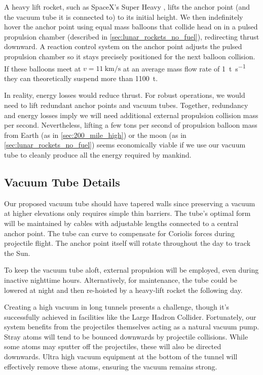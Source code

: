 \documentclass{article}
\begin{document}
A heavy lift rocket, such as SpaceX's Super Heavy \cite{spacex_super_heavy}, lifts the anchor point (and the vacuum tube it is connected to) to its initial height.  We then indefinitely hover the anchor point using equal mass balloons that collide head on in a pulsed propulsion chamber (described in \autoref{sec:lunar_rockets_no_fuel}), redirecting thrust downward.  A reaction control system on the anchor point adjusts the pulsed propulsion chamber so it stays precisely positioned for the next balloon collision.  If these balloons meet at $v=\SI{11}{\kilo\meter\per\second}$ at an average mass flow rate of \SI{1}{\tonne\per\second} they can theoretically suspend more than \SI{1100}{\tonne}.   

In reality, energy losses would reduce thrust.   For robust operations, we would need to lift redundant anchor points and vacuum tubes.  Together, redundancy and energy losses imply we will need additional external propulsion collision mass per second.  Nevertheless, lifting a few tons per second of propulsion balloon mass from Earth (as in \autoref{sec:200_mile_high}) or the moon (as in \autoref{sec:lunar_rockets_no_fuel}) seems economically viable if we use our vacuum tube to cleanly produce all the energy required by mankind. 

\subsection{Vacuum Tube Details}
Our proposed vacuum tube should have tapered walls since preserving a vacuum at higher elevations only requires simple thin barriers. The tube's optimal form will be maintained by cables with adjustable lengths connected to a central anchor point. The tube can curve to compensate for Coriolis forces during projectile flight. The anchor point itself will rotate throughout the day to track the Sun.

To keep the vacuum tube aloft, external propulsion will be employed, even during inactive nighttime hours. Alternatively, for maintenance, the tube could be lowered at night and then re-hoisted by a heavy-lift rocket the following day.

Creating a high vacuum in long tunnels presents a challenge, though it's successfully achieved in facilities like the Large Hadron Collider. Fortunately, our system benefits from the projectiles themselves acting as a natural vacuum pump. Stray atoms will tend to be bounced downwards by  projectile collisions. While some atoms may sputter off the projectiles, these will also be directed downwards. Ultra high vacuum equipment at the bottom of the tunnel will effectively remove these atoms, ensuring the vacuum remains strong.
\end{document}
